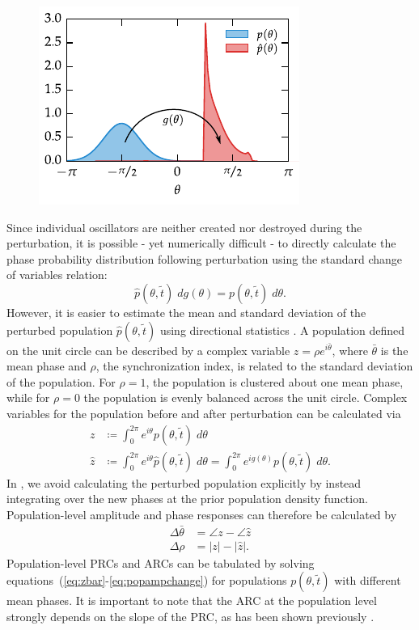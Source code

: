 \begin{figure}[tbp]
  \centering
  \includegraphics[width=.5\textwidth]{chap5/figures/phat.pdf}
  \label{fig:phatdef}
\end{figure}

Since individual oscillators are neither created nor destroyed during the perturbation, it is possible - yet numerically difficult - to directly calculate the phase probability distribution following perturbation using the standard change of variables relation:
\begin{equation}
  \hat{p}(\theta, \tilde{t})\; dg(\theta) = p(\theta, \tilde{t})\; d\theta.
  \label{eq:pdfinversion}
\end{equation}
However, it is easier to estimate the mean and standard deviation of the perturbed population $\hat{p}(\theta, \tilde{t})$ using directional statistics \cite{Mardia2009}.
A population defined on the unit circle can be described by a complex variable $z = \rho e^{i\bar{\theta}}$, where $\bar{\theta}$ is the mean phase and $\rho$, the synchronization index, is related to the standard deviation of the population.
For $\rho = 1$, the population is clustered about one mean phase, while for $\rho = 0$ the population is evenly balanced across the unit circle.
Complex variables for the population before and after perturbation can be calculated via
\begin{align}
  z &\coloneqq \int_0^{2\pi} e^{i\theta} p(\theta, \tilde{t}) \; d\theta \label{eq:zbar}\\
  \hat{z} &\coloneqq  \int_0^{2\pi} e^{i\theta} \hat{p}(\theta, \tilde{t}) \; d\theta = \int_0^{2\pi} e^{i g(\theta)} p(\theta, \tilde{t}) \; d\theta.
  \label{eq:zhat}
\end{align}
In , we avoid calculating the perturbed population explicitly by instead integrating over the new phases at the prior population density function.
Population-level amplitude and phase responses can therefore be calculated by
\begin{align}
  \Delta \bar{\theta} &= \angle z - \angle \hat{z} \\
  \Delta \rho &= |z| - |\hat{z}|.
  \label{eq:popampchange}
\end{align}
Population-level PRCs and ARCs can be tabulated by solving equations~(\ref{eq:zbar}-\ref{eq:popampchange}) for populations $p(\theta, \tilde{t})$ with different mean phases.
It is important to note that the ARC at the population level strongly depends on the slope of the PRC, as has been shown previously \cite{Ukai2007}.


